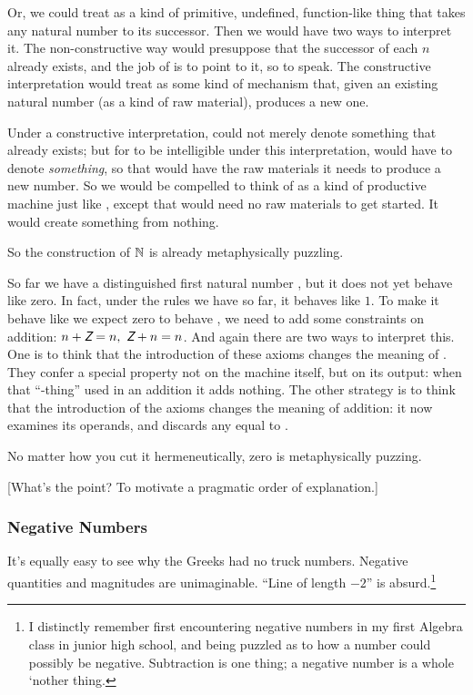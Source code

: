 \documentclass{article}
\begin{document}
Or, we could treat \Snat{} as a kind of primitive, undefined,
function-like thing that takes any natural number to its successor.
Then we would have two ways to interpret it. The non-constructive way
would presuppose that the successor of each \(n\) already exists, and
the job of \Snat{} is to point to it, so to speak. The constructive
interpretation would treat \Snat{} as some kind of mechanism that, given
an existing natural number (as a kind of raw material), produces a new
one.

Under a constructive interpretation, \Znat{} could not merely denote
something that already exists; but for \ZS{} to be intelligible
under this interpretation, \Znat{} would have to denote
\textit{something}, so that \Snat{} would have the raw materials it
needs to produce a new number. So we would be compelled to think of
\Znat{} as a kind of productive machine just like \Snat, except that
\Znat{} would need no raw materials to get started. It would create
something from nothing.

So the construction of \(\mathbb{N}\) is already metaphysically puzzling.

So far we have a distinguished first natural number \Znat, but it does
not yet behave like zero. In fact, under the rules we have so far, it
behaves like \(1\). To make it behave like we expect zero to behave ,
we need to add some constraints on addition: \(n + \Znat = n,\ \Znat +
n = n\). And again there are two ways to interpret this. One is to
think that the introduction of these axioms changes the meaning of
\Znat. They confer a special property not on the \Znat machine itself,
but on its output: when that ``\Znat-thing'' used in an addition it
adds nothing. The other strategy is to think that the introduction of
the axioms changes the meaning of addition: it now examines its
operands, and discards any equal to \Znat.

No matter how you cut it hermeneutically, zero is metaphysically
puzzing.

[What's the point? To motivate a pragmatic order of explanation.]

\subsubsection{Negative Numbers}

It's equally easy to see why the Greeks had no truck numbers. Negative
quantities and magnitudes are unimaginable. ``Line of length \(-2\)''
is absurd.\footnote{I distinctly remember first encountering negative
numbers in my first Algebra class in junior high school, and being
puzzled as to how a number could possibly be negative. Subtraction is
one thing; a negative number is a whole `nother thing.}
\end{document}
